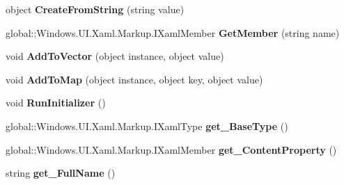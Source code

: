 \begin{DoxyCompactItemize}
object {\bfseries Create\+From\+String} (string value)
\item 
\mbox{\label{interface_windows_1_1_u_i_1_1_xaml_1_1_markup_1_1_i_xaml_type_a431f90f38a00401842b28f5ee3917d54}} 
global\+::\+Windows.\+U\+I.\+Xaml.\+Markup.\+I\+Xaml\+Member {\bfseries Get\+Member} (string name)
\item 
\mbox{\label{interface_windows_1_1_u_i_1_1_xaml_1_1_markup_1_1_i_xaml_type_a9542f31b1f9a3d9698ca632ae1a207e2}} 
void {\bfseries Add\+To\+Vector} (object instance, object value)
\item 
\mbox{\label{interface_windows_1_1_u_i_1_1_xaml_1_1_markup_1_1_i_xaml_type_ab81b106f354f661a28e2fe7c1cf529fb}} 
void {\bfseries Add\+To\+Map} (object instance, object key, object value)
\item 
\mbox{\label{interface_windows_1_1_u_i_1_1_xaml_1_1_markup_1_1_i_xaml_type_a43defd106c74e1f61c00f36498126028}} 
void {\bfseries Run\+Initializer} ()
\item 
\mbox{\label{interface_windows_1_1_u_i_1_1_xaml_1_1_markup_1_1_i_xaml_type_a25118da9dba36c6dcde8724ccbe078b0}} 
global\+::\+Windows.\+U\+I.\+Xaml.\+Markup.\+I\+Xaml\+Type {\bfseries get\+\_\+\+Base\+Type} ()
\item 
\mbox{\label{interface_windows_1_1_u_i_1_1_xaml_1_1_markup_1_1_i_xaml_type_aa0f823851084ebadb94e1bc55468b1dc}} 
global\+::\+Windows.\+U\+I.\+Xaml.\+Markup.\+I\+Xaml\+Member {\bfseries get\+\_\+\+Content\+Property} ()
\item 
\mbox{\label{interface_windows_1_1_u_i_1_1_xaml_1_1_markup_1_1_i_xaml_type_a5c1dd332e5b51cd2bb878fc56640a7a8}} 
string {\bfseries get\+\_\+\+Full\+Name} ()
\item 
\mbox{\label{interface_windows_1_1_u_i_1_1_xaml_1_1_markup_1_1_i_xaml_type_a16b5c5eaeeaad7ca4f010931852df7e4}} 

\end{DoxyCompactItemize}
